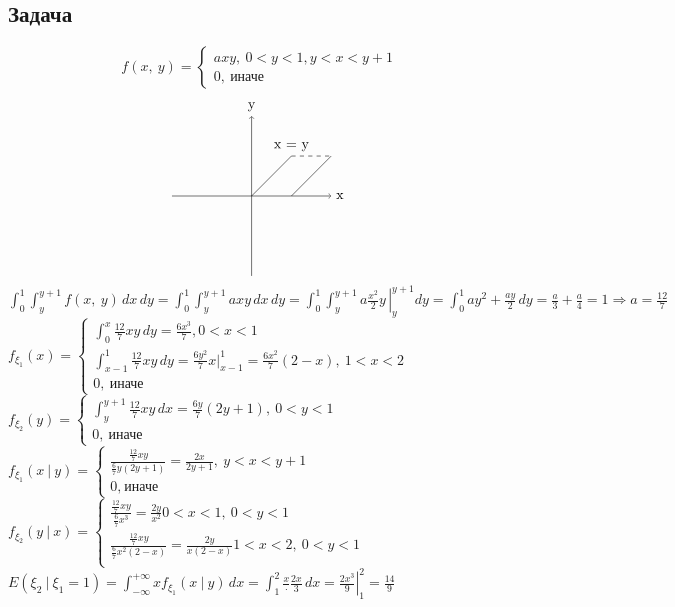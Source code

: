 \documentclass[12pt, a4paper]{article}
\begin{document}
    \subsection*{Задача}
    \[f(x,\ y) = \begin{cases}
        axy,\ 0 < y < 1, y < x < y + 1\\
        0,\ \text{иначе}
    \end{cases}\]
    \[\begin{tikzpicture}
        \draw[->] (-2, 0) -- (2, 0) node[anchor=west]{x};
        \draw[->] (0, -2) -- (0, 2) node[anchor=south]{y};
        \draw (0, 0) -- (1, 1) node[anchor=south]{x = y};
        \draw (1, 0) -- (2, 1);
        \draw[dashed] (1, 1) -- (2, 1);
    \end{tikzpicture}\]
    $\displaystyle \int_0^1\int_y^{y + 1} f(x,\ y)\, dx\, dy = \int_0^1 \int_y^{y + 1} axy\, dx\, dy = \int_0^1\int_y^{y + 1} a\left.\frac{x^2}{2} y\, \right|_y^{y + 1} dy = \int_0^1 ay^2 + \frac{ay}{2}\, dy = \frac{a}{3} + \frac{a}{4} = 1\Rightarrow a = \frac{12}{7}$\\
    $f_{\xi_1}(x) = \begin{cases}
        \displaystyle\int_0^x \frac{12}{7} xy\, dy = \frac{6x^3}{7}, 0 < x < 1\\
        \displaystyle\int_{x - 1}^{1} \frac{12}{7} xy\, dy = \frac{6y^2}{7} x |_{x - 1}^{1} = \frac{6x^2}{7}(2 - x),\ 1 < x < 2\\
        0,\ \text{иначе}
    \end{cases}$\\
    $f_{\xi_2}(y) = \begin{cases}
        \displaystyle\int_y^{y + 1} \frac{12}{7}xy\, dx = \frac{6y}{7}(2y + 1),\ 0 < y < 1\\
        0,\ \text{иначе}
    \end{cases}$\\
    $f_{\xi_1}(x\ |\ y) = \begin{cases}
        \frac{\frac{12}{7}xy}{\frac{6}{7} y(2y + 1)} = \frac{2x}{2y + 1},\ y < x < y + 1\\
        \text{0},\ \text{иначе}
    \end{cases}$\\
    $f_{\xi_2}(y\ |\ x) = \begin{cases}
        \frac{\frac{12}{7}xy}{\frac{6}{7}x^3}=\frac{2y}{x^2} 0 < x < 1,\ 0 < y < 1\\
        \frac{\frac{12}{7}xy}{\frac{6}{7}x^2(2 - x)} = \frac{2y}{x(2 - x)} 1 < x < 2,\ 0 < y < 1\\
    \end{cases}$\\
    $\displaystyle E(\xi_2\ |\ \xi_1 = 1) = \int_{-\infty}^{+\infty} x f_{\xi_1}(x\ |\ y)\, dx = \int_1^2 \frac{x}\cdot \frac{2x}{3}\, dx = \left.\frac{2x^3}{9}\right|_1^2 = \frac{14}{9}$
\end{document}
